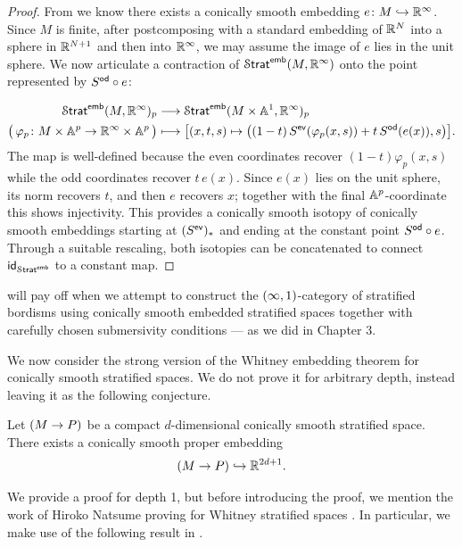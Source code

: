 \begin{proof}
From  we know there exists a conically smooth embedding $e \maps M \hookra \RR^{\oo}$. Since $M$ is finite, after postcomposing with a standard embedding of $\RR^{N}$ into a sphere in $\RR^{N+1}$ and then into $\RR^{\oo}$, we may assume the image of $e$ lies in the unit sphere. We now articulate a contraction of $\Strat^{\sf emb}(M,\RR^{\oo})$ onto the point represented by $S^{\sf od}\circ e$:

\begin{align}
    \Strat^{\sf emb}(M,\RR^{\oo})_p &\longra \Strat^{\sf emb}(M\times \AA^{1},\RR^{\oo})_p \\
    \big(\, \varphi_p \maps M \times \AA^p \ra \RR^{\oo} \times \AA^p \,\big) &\longmapsto \big[(x,t,s) \mapsto \big((1-t)\, S^{\sf ev}(\varphi_p(x,s)) + t\, S^{\sf od}(e(x)), s\big)\big].
\end{align}
The map is well-defined because the even coordinates recover $(1-t)\varphi_p(x,s)$ while the odd coordinates recover $t\,e(x)$. Since $e(x)$ lies on the unit sphere, its norm recovers $t$, and then $e$ recovers $x$; together with the final $\AA^p$-coordinate this shows injectivity. This provides a conically smooth isotopy of conically smooth embeddings starting at $(S^{\sf ev})_*$ and ending at the constant point $S^{\sf od}\circ e$. Through a suitable rescaling, both isotopies can be concatenated to connect $\id_{\Strat^{\sf emb}}$ to a constant map. 
\end{proof}

 will pay off when we attempt to construct the $(\oo,1)$-category of stratified bordisms using conically smooth embedded stratified spaces together with carefully chosen submersivity conditions — as we did in Chapter 3.   

We now consider the strong version of the Whitney embedding theorem for conically smooth stratified spaces. We do not prove it for arbitrary depth, instead leaving it as the following conjecture.

\begin{conjecture}\label{ch4:: conj: whitney strat}
Let $(M \ra P)$ be a compact $d$-dimensional conically smooth stratified space. There exists a conically smooth proper embedding 
\begin{equation}
    (M \ra P) \hookra \RR^{2d + 1}.
\end{equation}
\end{conjecture}

We provide a proof for depth 1, but before introducing the proof, we mention the work of Hiroko Natsume proving  for Whitney stratified spaces \cite{N80}. In particular, we make use of the following result in \cite{N80}.


